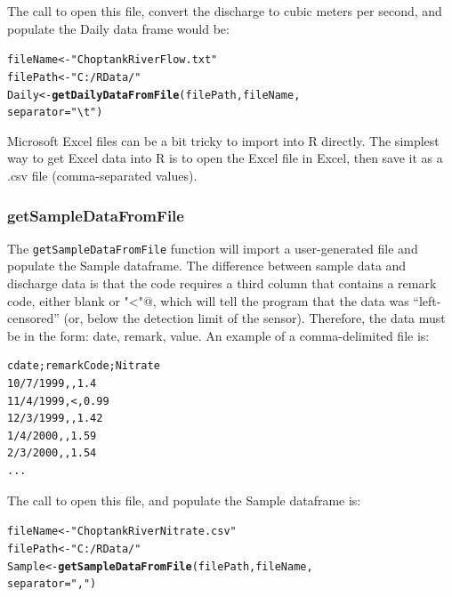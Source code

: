 \documentclass[a4paper,11pt]{article}\usepackage[]{graphicx}\usepackage[]{color}
\makeatletter
\newcommand{\hlstr}[1]{\textcolor[rgb]{0.192,0.494,0.8}{#1}}%
\newcommand{\hlstd}[1]{\textcolor[rgb]{0.345,0.345,0.345}{#1}}%
\newcommand{\hlkwb}[1]{\textcolor[rgb]{0.69,0.353,0.396}{#1}}%
\newcommand{\hlkwc}[1]{\textcolor[rgb]{0.333,0.667,0.333}{#1}}%
\newcommand{\hlkwd}[1]{\textcolor[rgb]{0.737,0.353,0.396}{\textbf{#1}}}%
\newenvironment{kframe}{%
 \def\at@end@of@kframe{}%
 \ifinner\ifhmode%
  \def\at@end@of@kframe{\end{minipage}}%
  \begin{minipage}{\columnwidth}%
 \fi\fi%
 \def\FrameCommand##1{\hskip\@totalleftmargin \hskip-\fboxsep
 \colorbox{shadecolor}{##1}\hskip-\fboxsep
     \hskip-\linewidth \hskip-\@totalleftmargin \hskip\columnwidth}%
 \MakeFramed {\advance\hsize-\width
   \@totalleftmargin\z@ \linewidth\hsize
   \@setminipage}}%
 {\par\unskip\endMakeFramed%
 \at@end@of@kframe}
\newenvironment{knitrout}{}{} %
\makeatother
\begin{document}
The call to open this file, convert the discharge to cubic meters per second, and populate the Daily data frame would be:
\begin{knitrout}
\color{fgcolor}\begin{kframe}
\begin{alltt}
\hlstd{fileName} \hlkwb{<-} \hlstr{"ChoptankRiverFlow.txt"}
\hlstd{filePath} \hlkwb{<-}  \hlstr{"C:/RData/"}
\hlstd{Daily} \hlkwb{<-} \hlkwd{getDailyDataFromFile}\hlstd{(filePath,fileName,}
                    \hlkwc{separator}\hlstd{=}\hlstr{"\textbackslash{}t"}\hlstd{)}
\end{alltt}
\end{kframe}
\end{knitrout}

Microsoft Excel files can be a bit tricky to import into R directly. The simplest way to get Excel data into R is to open the Excel file in Excel, then save it as a .csv file (comma-separated values). 

\FloatBarrier

\subsubsection{getSampleDataFromFile}
\label{sec:SampleFile}

\doublespacing
The \texttt{getSampleDataFromFile} function will import a user-generated file and populate the Sample dataframe. The difference between sample data and discharge data is that the code requires a third column that contains a remark code, either blank or \verb@"<"@, which will tell the program that the data was \enquote{left-censored} (or, below the detection limit of the sensor). Therefore, the data must be in the form: date, remark, value.   An example of a comma-delimited file is:

\singlespacing
\begin{verbatim}
cdate;remarkCode;Nitrate
10/7/1999,,1.4
11/4/1999,<,0.99
12/3/1999,,1.42
1/4/2000,,1.59
2/3/2000,,1.54
...
\end{verbatim}
\doublespacing

The call to open this file, and populate the Sample dataframe is:
\begin{knitrout}
\color{fgcolor}\begin{kframe}
\begin{alltt}
\hlstd{fileName} \hlkwb{<-} \hlstr{"ChoptankRiverNitrate.csv"}
\hlstd{filePath} \hlkwb{<-}  \hlstr{"C:/RData/"}
\hlstd{Sample} \hlkwb{<-} \hlkwd{getSampleDataFromFile}\hlstd{(filePath,fileName,}
                                \hlkwc{separator}\hlstd{=}\hlstr{","}\hlstd{)}
\end{alltt}
\end{kframe}
\end{knitrout}
\end{document}
